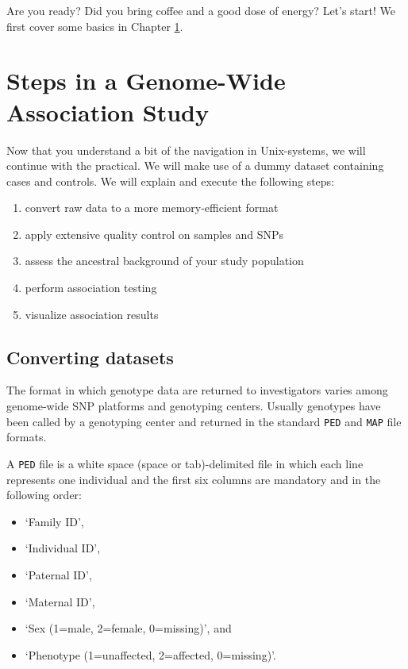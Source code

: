 \documentclass[
]{book}
\providecommand{\tightlist}{%
  \setlength{\itemsep}{0pt}\setlength{\parskip}{0pt}}
\begin{document}
Are you ready? Did you bring coffee and a good dose of energy? Let's start! We first cover some basics in Chapter \ref{gwas-basics}.

\hypertarget{gwas-basics}{%
\chapter{Steps in a Genome-Wide Association Study}\label{gwas-basics}}

Now that you understand a bit of the navigation in Unix-systems, we will continue with the practical. We will make use of a dummy dataset containing cases and controls. We will explain and execute the following steps:

\begin{enumerate}
\def\labelenumi{\arabic{enumi}.}
\tightlist
\item
  convert raw data to a more memory-efficient format
\item
  apply extensive quality control on samples and SNPs
\item
  assess the ancestral background of your study population
\item
  perform association testing
\item
  visualize association results
\end{enumerate}

\hypertarget{converting-datasets}{%
\section{Converting datasets}\label{converting-datasets}}

The format in which genotype data are returned to investigators varies among genome-wide SNP platforms and genotyping centers. Usually genotypes have been called by a genotyping center and returned in the standard \texttt{PED} and \texttt{MAP} file formats.

A \texttt{PED} file is a white space (space or tab)-delimited file in which each line represents one individual and the first six columns are mandatory and in the following order:

\begin{itemize}
\tightlist
\item
  `Family ID',
\item
  `Individual ID',
\item
  `Paternal ID',
\item
  `Maternal ID',
\item
  `Sex (1=male, 2=female, 0=missing)', and
\item
  `Phenotype (1=unaffected, 2=affected, 0=missing)'.
\end{itemize}
\end{document}

